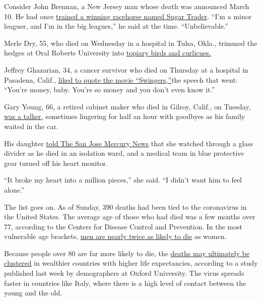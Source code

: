 Consider John Brennan, a New Jersey man whose death was announced March
10. He had once
\href{https://www.northjersey.com/story/news/2020/03/10/nj-horse-trainer-john-brennan-dies-coronavirus/5015168002/}{trained
a winning racehorse named Sugar Trader}. ``I'm a minor leaguer, and I'm
in the big leagues,'' he said at the time. ``Unbelievable.''

Merle Dry, 55, who died on Wednesday in a hospital in Tulsa, Okla.,
trimmed the hedges at Oral Roberts University into
\href{http://oruoracle.com/lifestyle/behind-the-scenery/}{topiary birds
and curlicues.}

Jeffrey Ghazarian, 34, a cancer survivor who died on Thursday at a
hospital in Pasadena, Calif.,
\href{https://www.facebook.com/search/top/?q=Jeffrey\%20Ghazarian\&epa=SEARCH_BOX}{liked
to quote the movie ``Swingers,''}the speech that went: ``You're money,
baby. You're so money and you don't even know it.''

Gary Young, 66, a retired cabinet maker who died in Gilroy, Calif., on
Tuesday,
\href{https://www.mercurynews.com/2020/03/19/coronavirus-gilroy-family-forbidden-from-dying-dads-bedside-broke-my-heart-into-a-million-pieces/}{was
a talker,} sometimes lingering for half an hour with goodbyes as his
family waited in the car.

His daughter
\href{https://www.mercurynews.com/2020/03/19/coronavirus-gilroy-family-forbidden-from-dying-dads-bedside-broke-my-heart-into-a-million-pieces/}{told
The San Jose Mercury News} that she watched through a glass divider as
he died in an isolation ward, and a medical team in blue protective gear
turned off his heart monitor.

``It broke my heart into a million pieces,'' she said. ``I didn't want
him to feel alone.''

The list goes on. As of Sunday, 390 deaths had been tied to the
coronavirus in the United States. The average age of those who had died
was a few months over 77, according to the Centers for Disease Control
and Prevention. In the most vulnerable age brackets,
\href{https://www.nytimes.com/2020/02/20/health/coronavirus-men-women.html}{men
are nearly twice as likely to die} as women.

Because people over 80 are far more likely to die, the
\href{https://www.medrxiv.org/content/10.1101/2020.03.15.20036293v1}{deaths
may ultimately be clustered} in wealthier countries with higher life
expectancies, according to a study published last week by demographers
at Oxford University. The virus spreads faster in countries like Italy,
where there is a high level of contact between the young and the old.

